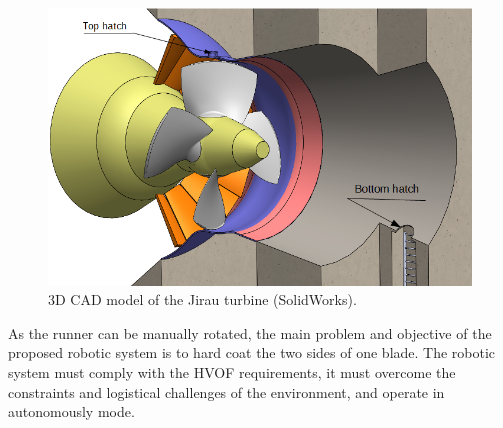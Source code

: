 \begin{figure}[h!]
\centering
	\includegraphics[width=\columnwidth]{figs/problem/ambiente_3d.PNG} 
	\caption{3D CAD model of the Jirau
	turbine (SolidWorks\raisebox{1ex}{\textregistered}).}
	\label{fig::ambiente3d}
\end{figure}


As the runner can be manually rotated, the main problem and objective of the
proposed robotic system is to hard coat the two sides of one blade. The
robotic system must comply with the HVOF requirements, it must overcome the
constraints and logistical challenges of the environment, and operate in
autonomously mode. 

